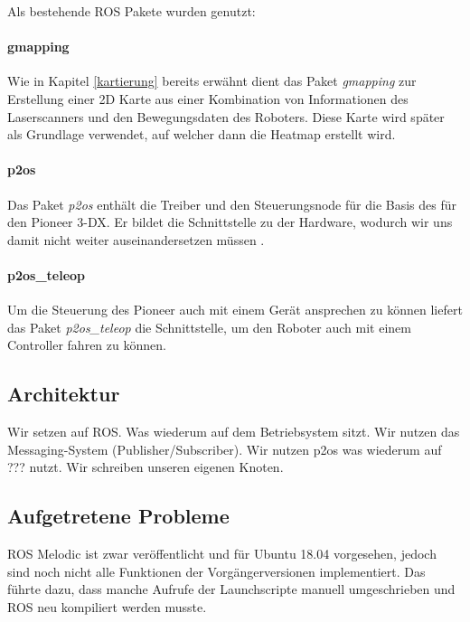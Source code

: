 \documentclass{scrartcl}%
\begin{document}
Als bestehende ROS Pakete wurden genutzt:

\paragraph{gmapping}
Wie in Kapitel \ref{kartierung} bereits erwähnt dient das Paket \textit{gmapping} zur Erstellung einer 2D Karte aus einer Kombination von Informationen des Laserscanners und den Bewegungsdaten des Roboters. Diese Karte wird später als Grundlage verwendet, auf welcher dann die Heatmap erstellt wird.

\paragraph{p2os}
Das Paket \textit{p2os} enthält die Treiber und den Steuerungsnode für die Basis des für den Pioneer 3-DX. Er bildet die Schnittstelle zu der Hardware, wodurch wir uns damit nicht weiter auseinandersetzen müssen \cite{p2os}.

\paragraph{p2os\_teleop}
Um die Steuerung des Pioneer auch mit einem Gerät ansprechen zu können liefert das Paket \textit{p2os\_teleop} die Schnittstelle, um den Roboter auch mit einem Controller fahren zu können.


\subsection{Architektur}
Wir setzen auf ROS. Was wiederum auf dem Betriebsystem sitzt. Wir nutzen das Messaging-System (Publisher/Subscriber). Wir nutzen p2os was wiederum auf ??? nutzt. Wir schreiben unseren eigenen Knoten.

\subsection{Aufgetretene Probleme}
ROS Melodic ist zwar veröffentlicht und für Ubuntu 18.04 vorgesehen, jedoch sind noch nicht alle Funktionen der Vorgängerversionen implementiert. Das führte dazu, dass manche Aufrufe der Launchscripte manuell umgeschrieben und ROS neu kompiliert werden musste.
\end{document}
